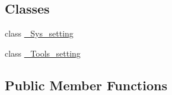 \subsection*{Classes}
\begin{DoxyCompactItemize}
\item 
class \hyperlink{classMIS_1_1Muon__Imaging__Algorithm_1_1InvDataFactory_1_1Setting_1_1Setting_1_1__Sys__setting}{\+\_\+\+Sys\+\_\+setting}
\item 
class \hyperlink{classMIS_1_1Muon__Imaging__Algorithm_1_1InvDataFactory_1_1Setting_1_1Setting_1_1__Tools__setting}{\+\_\+\+Tools\+\_\+setting}
\end{DoxyCompactItemize}
\subsection*{Public Member Functions}
